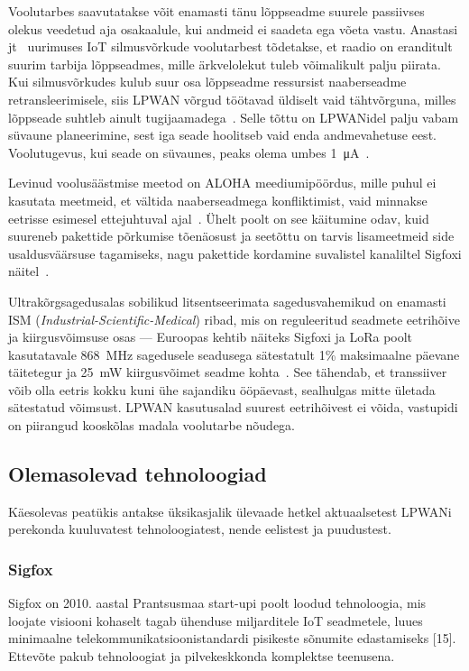 \documentclass[12pt]{article}
\begin{document}
Voolutarbes saavutatakse võit enamasti tänu lõppseadme suurele passiivses olekus veedetud aja osakaalule, kui andmeid ei saadeta ega võeta vastu.
Anastasi jt~\cite{anastasi} uurimuses IoT silmusvõrkude voolutarbest tõdetakse, et raadio on eranditult suurim tarbija lõppseadmes, mille ärkvelolekut tuleb võimalikult palju piirata.
Kui silmusvõrkudes kulub suur osa lõppseadme ressursist naaberseadme retransleerimisele, siis LPWAN võrgud töötavad üldiselt vaid tähtvõrguna,  milles lõppseade suhtleb ainult tugijaamadega~\cite{centenaro}.
Selle tõttu on LPWANidel palju vabam süvaune planeerimine, sest iga seade hoolitseb vaid enda andmevahetuse eest. Voolutugevus, kui seade on süvaunes, peaks olema umbes \SI{1}{\micro\ampere}~\cite{goursaud}.

Levinud voolusäästmise meetod on ALOHA meediumipöördus, mille puhul ei kasutata meetmeid, et vältida naaberseadmega konfliktimist, vaid minnakse eetrisse esimesel ettejuhtuval ajal~\cite{raza}.
Ühelt poolt on see käitumine odav, kuid suureneb pakettide põrkumise tõenäosust ja seetõttu on tarvis lisameetmeid side usaldusväärsuse tagamiseks, nagu pakettide kordamine suvalistel kanaliltel Sigfoxi näitel~\cite{raza}.

Ultrakõrgsagedusalas sobilikud litsentseerimata sagedusvahemikud on enamasti ISM (\textit{Industrial-Scientific-Medical}) ribad, mis on reguleeritud seadmete eetrihõive ja kiirgusvõimsuse osas — Euroopas kehtib näiteks Sigfoxi ja LoRa poolt kasutatavale \SI{868}{\mega\hertz} sagedusele seadusega sätestatult 1\% maksimaalne päevane täitetegur ja \SI{25}{\milli\watt} kiirgusvõimet seadme kohta~\cite{etsi}.
See tähendab, et transsiiver võib olla eetris kokku kuni ühe sajandiku ööpäevast, sealhulgas mitte ületada sätestatud võimsust.
LPWAN kasutusalad suurest eetrihõivest ei võida, vastupidi on piirangud kooskõlas madala voolutarbe nõudega.

\subsection{Olemasolevad tehnoloogiad}

Käesolevas peatükis antakse üksikasjalik ülevaade hetkel aktuaalsetest LPWANi perekonda kuuluvatest tehnoloogiatest, nende eelistest ja puudustest.

\subsubsection{Sigfox}

Sigfox on 2010. aastal Prantsusmaa start-upi poolt loodud tehnoloogia, mis loojate visiooni kohaselt tagab ühenduse miljarditele IoT seadmetele, luues minimaalne telekommunikatsioonistandardi pisikeste sõnumite edastamiseks [15].
Ettevõte pakub tehnoloogiat ja pilvekeskkonda komplektse teenusena.
\end{document}
